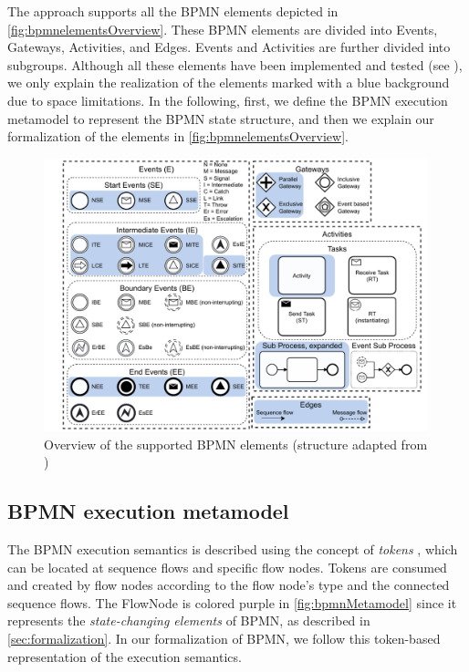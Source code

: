 \documentclass{lmcs} %
\begin{document}
The approach supports all the BPMN elements depicted in \autoref{fig:bpmnelementsOverview}.
These BPMN elements are divided into \textsf{Events}, \textsf{Gateways}, \textsf{Activities}, and \textsf{Edges}.
\textsf{Events} and \textsf{Activities} are further divided into subgroups.
Although all these elements have been implemented and tested (see \cite{timkrauterLMCS2024Artifacts2023}), we only explain the realization of the elements marked with a blue background due to space limitations.
In the following, first, we define the BPMN execution metamodel to represent the BPMN state structure, and then we explain our formalization of the elements in \autoref{fig:bpmnelementsOverview}.


\begin{figure}[ht]
    \centering
    \includegraphics[width=0.99\textwidth]{images/bpmn_semantics-elements-overview.pdf}
    \caption{Overview of the supported BPMN elements (structure adapted from \cite{houhouFirstOrderLogicVerification2022})}
    \label{fig:bpmnelementsOverview}
\end{figure}


\subsection{BPMN execution metamodel}

The BPMN execution semantics is described using the concept of \textit{tokens} \cite{objectmanagementgroupBusinessProcessModel2013, freundRealLifeBPMNUsing2019}, which can be located at sequence flows and specific flow nodes.
Tokens are consumed and created by flow nodes according to the flow node's type and the connected sequence flows.
The \textsf{FlowNode} is colored purple in \autoref{fig:bpmnMetamodel} since it represents the \textit{state-changing elements} of BPMN, as described in \autoref{sec:formalization}.
In our formalization of BPMN, we follow this token-based representation of the execution semantics.
\end{document}
